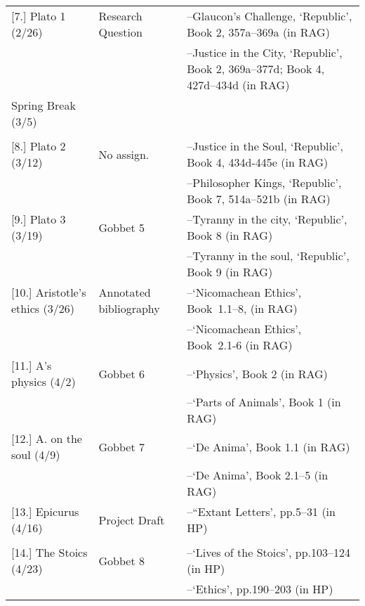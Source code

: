 \documentclass[article,oneside]{memoir}
\begin{document}
\begin{center}
\begin{longtable}{p{4.5cm}p{2cm}p{6cm}}
[7.] Plato 1 (2/26)			 			& Research Question		& --Glaucon's Challenge, `Republic', Book 2, 357a--369a (in RAG)  \\
				     			 	& 	      			& --Justice in the City, `Republic', Book 2, 369a--377d; Book 4, 427d--434d (in RAG) \\  [1.8\baselineskip]

Spring Break (3/5)					& 				 & 	\\
								& 				 &   \\ [1.8\baselineskip]	

[8.] Plato 2	(3/12)					& No assign.		& --Justice in the Soul, `Republic', Book 4, 434d-445e (in RAG)\\
	            						&		      		& --Philosopher Kings, `Republic', Book 7, 514a--521b (in RAG) \\  [1.8\baselineskip]

[9.] Plato 3	(3/19)					& Gobbet 5		& --Tyranny in the city, `Republic', Book 8 (in RAG) \\
		            					&		      		& --Tyranny in the soul, `Republic', Book 9  (in RAG)\\  [1.8\baselineskip]


[10.] Aristotle's ethics	(3/26)			& Annotated bibliography		& --`Nicomachean Ethics', Book\ 1.1--8, (in RAG) \\
			    					& 				& --`Nicomachean Ethics', Book\ 2.1-6 (in RAG) \\ [1.8\baselineskip]


[11.] A's physics (4/2)			& Gobbet 6		& --`Physics', Book 2 (in RAG) \\ 
				   			   	&			      	& --`Parts of Animals', Book 1 (in RAG)  \\ [1.8\baselineskip]

						
[12.] A. on the soul (4/9)	      		& Gobbet 7		&  --`De Anima', Book 1.1 (in RAG) \\
				   			   	&			      	& --`De Anima', Book 2.1--5 (in RAG) \\  [1.8\baselineskip]

						 
[13.] Epicurus (4/16)	    				& Project Draft		& --``Extant Letters', pp.5--31 (in HP)\\
			      					&			      	&  \\ [1.8\baselineskip]

[14.] The Stoics	(4/23)			  	& Gobbet 8		&--`Lives of the Stoics', pp.103--124 (in HP) \\ 
			    				  	&		      		& --`Ethics', pp.190--203 (in HP) \\[1.8\baselineskip]


\end{longtable}
\end{center}
\end{document}
